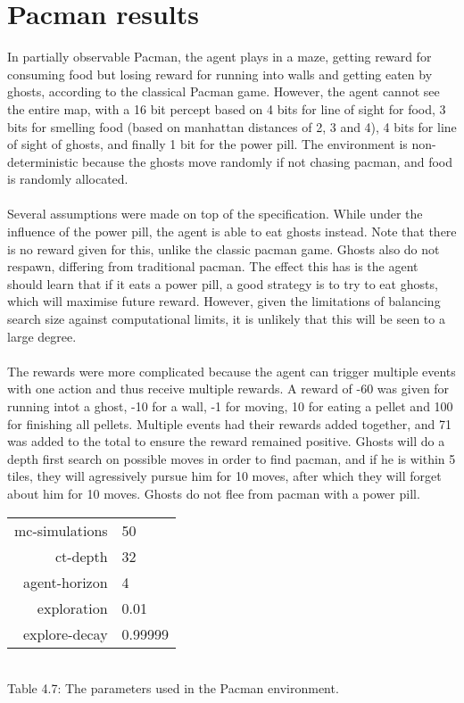 \documentclass[pdftex,twoside,a4paper]{report}
\begin{document}
\section{Pacman results}
In partially observable Pacman, the agent plays in a maze, getting reward for consuming food but losing reward for running into walls and getting eaten by ghosts, according to the classical Pacman game. However, the agent cannot see the entire map, with a 16 bit percept based on 4 bits for line of sight for food, 3  bits for smelling food (based on manhattan distances of 2, 3 and 4), 4 bits for line of sight of ghosts, and finally 1 bit for the power pill. The environment is non-deterministic because the ghosts move randomly if not chasing pacman, and food is randomly allocated.\\\\
Several assumptions were made on top of the specification.  While under the influence of the power pill, the agent is able to eat ghosts instead. Note that there is no reward given for this, unlike the classic pacman game. Ghosts also do not respawn, differing from traditional pacman. The effect this has is the agent should learn that if it eats a power pill, a good strategy is to try to eat ghosts, which will maximise future reward. However, given the limitations of balancing search size against computational limits, it is unlikely that this will be seen to a large degree.\\\\
The rewards were more complicated because the agent can trigger multiple events with one action and thus receive multiple rewards. A reward of -60 was given for running intot a ghost, -10 for a wall, -1 for moving, 10 for eating a pellet and 100 for finishing all pellets. Multiple events had their rewards added together, and 71 was added to the total to ensure the reward remained positive. Ghosts will do a depth first search on possible moves in order to find pacman, and if he is within 5 tiles, they will agressively pursue him for 10 moves, after which they will forget about him for 10 moves. Ghosts do not flee from pacman with a power pill.
\begin{center}
\begin{tabular}{| r | l | }
\hline
mc-simulations & 50\\
ct-depth & 32\\
agent-horizon & 4\\
exploration & 0.01\\
explore-decay & 0.99999\\
\hline
\end{tabular}\\
\vspace{0.5mm}
Table 4.7: The parameters used in the Pacman environment.
\end{center}
\end{document}
